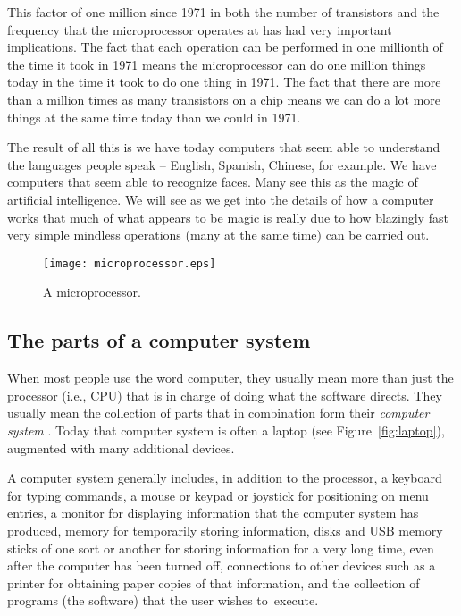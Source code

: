 \documentclass{patt}
\begin{document}
This factor of one million since 1971 in both the number of transistors and 
the frequency that the microprocessor operates at has had very important 
implications.  The fact that each operation can be 
performed in one millionth of the time it took in 1971 means the 
microprocessor can do one million things today in the time it took to do one 
thing in 1971.  The fact that there are more than a million times as many 
transistors on a chip means we can do a lot 
more things at the same time today than we could in 1971.  

The result of all this is we have today computers that seem able to
understand the languages people speak -- English, Spanish, Chinese, for
example.  We have computers that seem able to recognize faces.  Many see
this as the magic of artificial intelligence.  We will see as we get into 
the details of how a computer works that much of what appears to be magic 
is really due to how blazingly fast very simple mindless operations (many 
at the same time) can be carried out.

\begin{figure}
\centerline{\texttt{[image: microprocessor.eps]}}
\caption{A microprocessor.}
\label{fig:microprocessor}
\vspace{12pt}
\end{figure}

\FloatBarrier

\subsection{The parts of a computer system}

When most people use the word computer, they
usually mean more than just the processor (i.e., CPU) that is in charge of 
doing what the software directs.  They usually mean the
collection of parts that in combination form their {\em computer
system} .  Today that computer system is often a laptop
(see Figure~\ref{fig:laptop}), augmented with many additional devices.

A computer system generally includes, in addition to the processor, a keyboard
for typing commands, a mouse or keypad or joystick for positioning on menu 
entries, a monitor for displaying information that the computer system has
produced, memory for temporarily storing information, disks and USB memory 
sticks of one sort or another for storing information for a very long
time, even after the computer has been turned off, connections to other 
devices such as a printer for obtaining paper copies of that information,
and the collection of programs (the software) that the user wishes to~execute.
\end{document}
